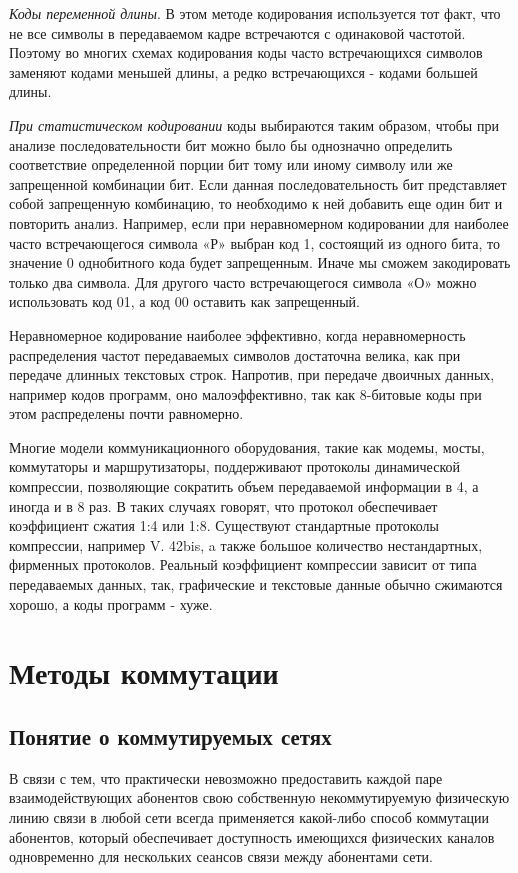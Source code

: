\emph{Коды переменной длины}.
В этом методе кодирования используется тот факт, что не все символы в передаваемом кадре встречаются с одинаковой частотой.
Поэтому во многих схемах кодирования коды часто встречающихся символов заменяют кодами меньшей длины, а редко встречающихся - кодами большей длины.

\emph{При статистическом кодировании} коды выбираются таким образом, чтобы при анализе последовательности бит можно было бы однозначно определить соответствие определенной порции бит тому или иному символу или же запрещенной комбинации бит.
Если данная последовательность бит представляет собой запрещенную комбинацию, то необходимо к ней добавить еще один бит и повторить анализ.
Например, если при неравномерном кодировании для наиболее часто встречающегося символа «Р» выбран код 1, состоящий из одного бита, то значение 0 однобитного кода будет запрещенным.
Иначе мы сможем закодировать только два символа.
Для другого часто встречающегося символа «О» можно использовать код 01, а код 00 оставить как запрещенный.

Неравномерное кодирование наиболее эффективно, когда неравномерность распределения частот передаваемых символов достаточна велика, как при передаче длинных текстовых строк.
Напротив, при передаче двоичных данных, например кодов программ, оно малоэффективно, так как 8-битовые коды при этом распределены почти равномерно.

Многие модели коммуникационного оборудования, такие как модемы, мосты, коммутаторы и маршрутизаторы, поддерживают протоколы динамической компрессии, позволяющие сократить объем передаваемой информации в 4, а иногда и в 8 раз.
В таких случаях говорят, что протокол обеспечивает коэффициент сжатия 1:4 или 1:8.
Существуют стандартные протоколы компрессии, например V.
42bis, a также большое количество нестандартных, фирменных протоколов.
Реальный коэффициент компрессии зависит от типа передаваемых данных, так, графические и текстовые данные обычно сжимаются хорошо, а коды программ - хуже.

\section{Методы коммутации}

\subsection{Понятие о коммутируемых сетях}

В связи с тем, что практически невозможно предоставить каждой паре взаимодействующих абонентов свою собственную некоммутируемую физическую линию связи в любой сети всегда применяется какой-либо способ коммутации абонентов, который обеспечивает доступность имеющихся физических каналов одновременно для нескольких сеансов связи между абонентами сети.

